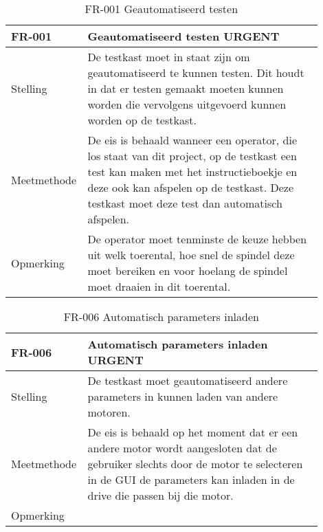 \vspace{0.5cm}

\begin{table}[ht]
	\caption{FR-001 Geautomatiseerd testen}
	\label{tab:FR-001}
	\centering
	\begin{tabular}{|p{0.15\linewidth}|p{0.75\linewidth}|}
		\hline
		FR-001 & Geautomatiseerd testen URGENT \\
		
		\hline
		
		Stelling & De testkast moet in staat zijn om geautomatiseerd te kunnen testen. Dit houdt in dat er testen gemaakt moeten kunnen worden die vervolgens uitgevoerd kunnen worden op de testkast.\\
		
		Meetmethode & De eis is behaald wanneer een operator, die los staat van dit project, op de testkast een test kan maken met het instructieboekje en deze ook kan afspelen op de testkast. Deze testkast moet deze test dan automatisch afspelen. \\
		
		Opmerking & De operator moet tenminste de keuze hebben uit welk toerental, hoe snel de spindel deze moet bereiken en voor hoelang de spindel moet draaien in dit toerental. \\
		\hline
	\end{tabular}
\end{table}

\vspace{0.5cm}

\begin{table}[ht]
	\caption{FR-006 Automatisch parameters inladen}
	\label{tab:FR-006}
	\centering
	\begin{tabular}{|p{0.15\linewidth}|p{0.75\linewidth}|}
		\hline
		FR-006 & Automatisch parameters inladen URGENT \\
		
		\hline
		
		Stelling & De testkast moet geautomatiseerd andere parameters in kunnen laden van andere motoren.\\
		
		Meetmethode & De eis is behaald op het moment dat er een andere motor wordt aangesloten dat de gebruiker slechts door de motor te selecteren in de GUI de parameters kan inladen in de drive die passen bij die motor. \\
		
		Opmerking &  \\
		\hline
	\end{tabular}
\end{table}

